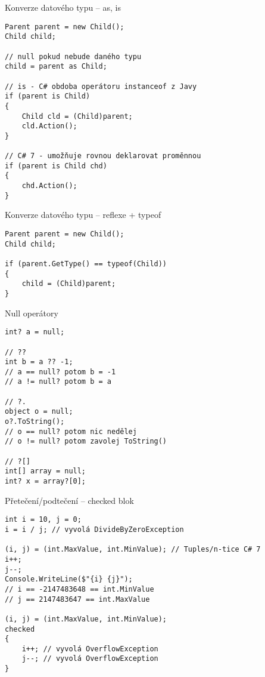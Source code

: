 \begin{frame}[fragile]
\begin{exampleblock}{Konverze datového typu -- as, is}
\begin{lstlisting}[basicstyle=\small]
Parent parent = new Child();
Child child;

// null pokud nebude daného typu
child = parent as Child; 

// is - C# obdoba operátoru instanceof z Javy
if (parent is Child)
{
    Child cld = (Child)parent;
    cld.Action();
}

// C# 7 - umožňuje rovnou deklarovat proměnnou
if (parent is Child chd)
{
    chd.Action();
}
\end{lstlisting}
\end{exampleblock}
\end{frame}




\begin{frame}[fragile]
\begin{bonusblock}{Konverze datového typu -- reflexe + typeof}
\begin{lstlisting}[basicstyle=\small]
Parent parent = new Child();
Child child;

if (parent.GetType() == typeof(Child)) 
{
    child = (Child)parent;
}
\end{lstlisting}
\end{bonusblock}
\end{frame}



\begin{frame}[fragile]
\begin{exampleblock}{Null operátory}
\begin{lstlisting}
int? a = null;

// ??
int b = a ?? -1;
// a == null? potom b = -1
// a != null? potom b = a

// ?.
object o = null;
o?.ToString();
// o == null? potom nic nedělej
// o != null? potom zavolej ToString()

// ?[]
int[] array = null;
int? x = array?[0];
\end{lstlisting}
\end{exampleblock}
\end{frame}



\begin{frame}[fragile]
\begin{bonusblock}{Přetečení/podtečení -- checked blok}
\begin{lstlisting}
int i = 10, j = 0;
i = i / j; // vyvolá DivideByZeroException

(i, j) = (int.MaxValue, int.MinValue); // Tuples/n-tice C# 7
i++;
j--;
Console.WriteLine($"{i} {j}");
// i == -2147483648 == int.MinValue
// j == 2147483647 == int.MaxValue

(i, j) = (int.MaxValue, int.MinValue);
checked
{
    i++; // vyvolá OverflowException
    j--; // vyvolá OverflowException
}
\end{lstlisting}
\end{bonusblock}
\end{frame}


